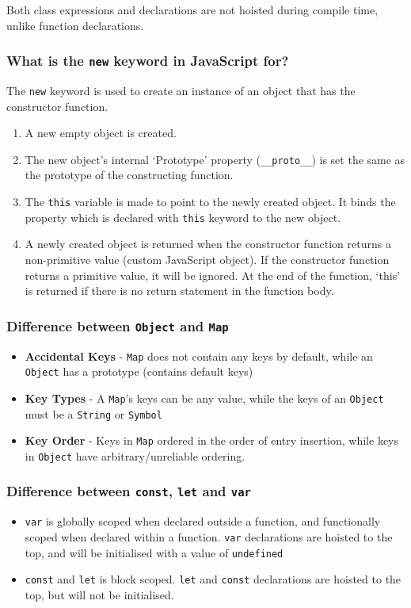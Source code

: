 \documentclass[12pt, a4paper]{article}
\newcommand{\code}[1]{\texttt{#1}}
\begin{document}
Both class expressions and declarations are not hoisted during compile time, unlike function declarations.

\subsubsection*{What is the \code{new} keyword in JavaScript for?}
The \code{new} keyword is used to create an instance of an object that has the constructor function.
\begin{enumerate}
    \item A new empty object is created.
    \item The new object’s internal ‘Prototype’ property (\code{\_\_proto\_\_}) is set the same as the prototype of the constructing function.
    \item The \code{this} variable is made to point to the newly created object. It binds the property which is declared with \code{this} keyword to the new object.
    \item A newly created object is returned when the constructor function returns a non-primitive value (custom JavaScript object).
          If the constructor function returns a primitive value, it will be ignored.
          At the end of the function, ‘this’ is returned if there is no return statement in the function body.    
\end{enumerate}

\subsubsection*{Difference between \code{Object} and \code{Map}}
\begin{itemize}
  \item \textbf{Accidental Keys} - \code{Map} does not contain any keys by default, while an \code{Object} has a prototype (contains default keys)
  \item \textbf{Key Types} - A \code{Map}'s keys can be any value, while the keys of an \code{Object} must be a \code{String} or \code{Symbol}
  \item \textbf{Key Order} - Keys in \code{Map} ordered in the order of entry insertion, while keys in \code{Object} have arbitrary/unreliable ordering. 
\end{itemize}

\subsubsection*{Difference between \code{const}, \code{let} and \code{var}}
\begin{itemize}
  \item \code{var} is globally scoped when declared outside a function, and functionally scoped when declared within a function.\newline
        \code{var} declarations are hoisted to the top, and will be initialised with a value of \code{undefined}
  \item \code{const} and \code{let} is block scoped.\newline
        \code{let} and \code{const} declarations are hoisted to the top, but will not be initialised.
\end{itemize}
\end{document}
